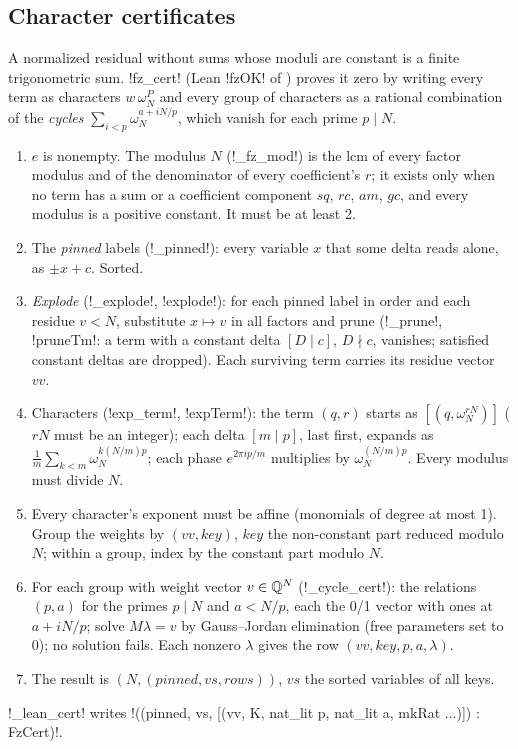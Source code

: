 {{{\subsection{Character certificates}\label{sec:lean-export-sym-fz}

A normalized residual without sums whose moduli are constant is a finite trigonometric sum.
\lexpy!fz_cert! (Lean \lexlean!fzOK! of ) proves it zero by writing every term
as characters $w\,\omega_N^{P}$ and every group of characters as a rational combination of the
\emph{cycles} $\sum_{i<p}\omega_N^{a + iN/p}$, which vanish for each prime $p \mid N$.

\begin{algorithm}\label{alg:lean-export-sym-fz}
\begin{enumerate}
\item $e$ is nonempty. The modulus $N$ (\lexpy!_fz_mod!) is the lcm of every factor modulus and of
the denominator of every coefficient's $r$; it exists only when no term has a sum or a
coefficient component $sq$, $rc$, $am$, $gc$, and every modulus is a positive constant. It must
be at least 2.
\item The \emph{pinned} labels (\lexpy!_pinned!): every variable $x$ that some delta reads alone,
as $\pm x + c$. Sorted.
\item \emph{Explode} (\lexpy!_explode!, \lexlean!explode!): for each pinned label in order and each
residue $v < N$, substitute $x \mapsto v$ in all factors and prune (\lexpy!_prune!,
\lexlean!pruneTm!: a term with a constant delta $[D\mid c]$, $D\nmid c$, vanishes; satisfied
constant deltas are dropped). Each surviving term carries its residue vector $vv$.
\item Characters (\lexpy!exp_term!, \lexlean!expTerm!): the term $(q, r)$ starts as $[(q,
\omega_N^{rN})]$ ($rN$ must be an integer); each delta $[m \mid p]$, last first, expands as
$\frac1m\sum_{k<m}\omega_N^{k(N/m)p}$; each phase $e^{2\pi i p/m}$ multiplies by
$\omega_N^{(N/m)p}$. Every modulus must divide $N$.
\item Every character's exponent must be affine (monomials of degree at most 1). Group the
weights by $(vv, \mathit{key})$, $\mathit{key}$ the non-constant part reduced modulo $N$; within
a group, index by the constant part modulo $N$.
\item For each group with weight vector $v\in\mathbb{Q}^N$ (\lexpy!_cycle_cert!): the relations $(p, a)$
for the primes $p\mid N$ and $a < N/p$, each the 0/1 vector with ones at $a + iN/p$; solve
$M\lambda = v$ by Gauss--Jordan elimination (free parameters set to 0); no solution fails. Each
nonzero $\lambda$ gives the row $(vv, \mathit{key}, p, a, \lambda)$.
\item The result is $(N, (\mathit{pinned}, vs, \mathit{rows}))$, $vs$ the sorted variables of
all keys.
\end{enumerate}
\end{algorithm}
\lexpy!_lean_cert! writes \lexlean!((pinned, vs, [(vv, K, nat_lit p, nat_lit a, mkRat ...)]) : FzCert)!.

}}}
